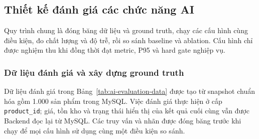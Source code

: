 
\subsection{Thiết kế đánh giá các chức năng AI}

\begingroup
\setlength{\tabcolsep}{3pt}
\renewcommand{\arraystretch}{0.88}

Quy trình chung là đóng băng dữ liệu và ground truth, chạy các cấu hình cùng điều kiện, đo chất lượng và độ trễ, rồi so sánh baseline và ablation. Cấu hình chỉ được nghiệm thu khi đồng thời đạt metric, P95 và hard gate nghiệp vụ.

\subsubsection{Dữ liệu đánh giá và xây dựng ground truth}

Dữ liệu đánh giá trong Bảng~\ref{tab:ai-evaluation-data} được tạo từ snapshot chuẩn hóa gồm 1.000 sản phẩm trong MySQL. Việc đánh giá thực hiện ở cấp \texttt{product\_id}; giá, tồn kho và trạng thái hiển thị của kết quả cuối cùng vẫn được Backend đọc lại từ MySQL. Các truy vấn và nhãn được đóng băng trước khi chạy để mọi cấu hình sử dụng cùng một điều kiện so sánh.

